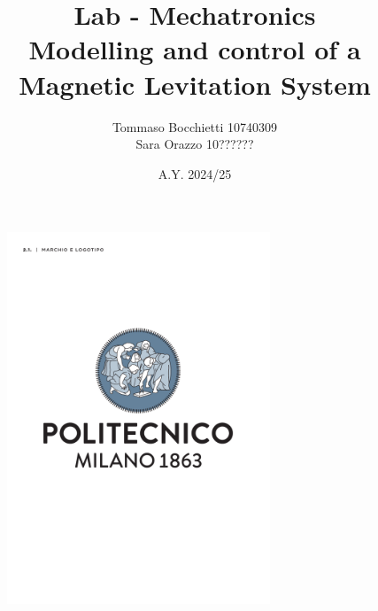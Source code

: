 \documentclass{assignment}
\begin{document}
\title{Lab - Mechatronics \\ Modelling and control of a Magnetic Levitation System}
\author{Tommaso Bocchietti 10740309 \\ Sara Orazzo 10??????}
\date{A.Y. 2024/25}

\maketitle

\begin{figure}[H]
    \centering
    \includegraphics[width=0.7\textwidth]{./pdf/Polimi_logo_coverpage.pdf}
    \label{fig:Polimi_logo}
\end{figure}

\clearpage
\tableofcontents
\listoffigures
\listoftables
\lstlistoflistings

% 
% 
% 
% 
% 
% 

% 
% 
\end{document}
